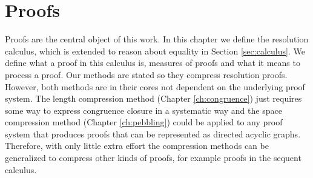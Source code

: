 \chapter*{Proofs}

Proofs are the central object of this work.
In this chapter we define the resolution calculus, which is extended to reason about equality in Section \ref{sec:calculus}.
We define what a proof in this calculus is, measures of proofs and what it means to process a proof.
Our methods are stated so they compress resolution proofs.
However, both methods are in their cores not dependent on the underlying proof system.
The length compression method (Chapter \ref{ch:congruence}) just requires some way to express congruence closure in a systematic way and the space compression method (Chapter \ref{ch:pebbling}) could be applied to any proof system that produces proofs that can be represented as directed acyclic graphs.
Therefore, with only little extra effort the compression methods can be generalized to compress other kinds of proofs, for example proofs in the sequent calculus.



%

%



